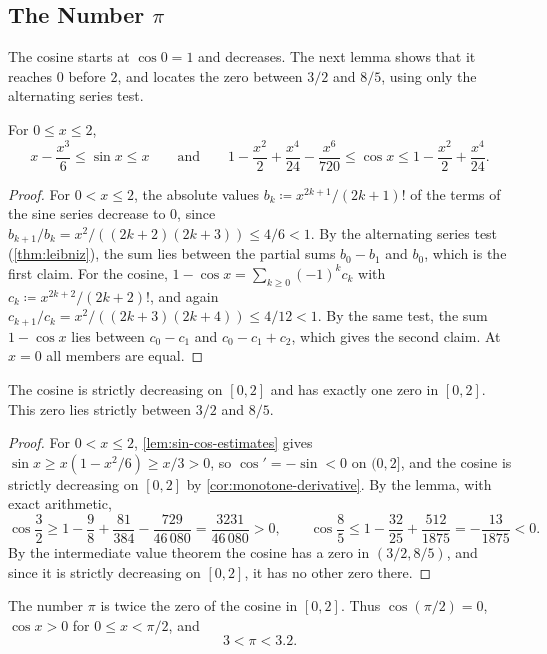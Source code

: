 \subsection{The Number \texorpdfstring{$\pi$}{pi}}

The cosine starts at $\cos0=1$ and decreases. The next lemma shows that it reaches $0$ before $2$, and locates the zero between $3/2$ and $8/5$, using only the alternating series test.

\begin{lemma}
\label{lem:sin-cos-estimates}
For $0\le x\le2$,
\[
x-\frac{x^3}6\le\sin x\le x\qquad\text{and}\qquad1-\frac{x^2}2+\frac{x^4}{24}-\frac{x^6}{720}\le\cos x\le1-\frac{x^2}2+\frac{x^4}{24}.
\]
\end{lemma}

\begin{proof}
For $0<x\le2$, the absolute values $b_k\coloneqq x^{2k+1}/(2k+1)!$ of the terms of the sine series decrease to $0$, since $b_{k+1}/b_k=x^2/((2k+2)(2k+3))\le4/6<1$. By the alternating series test (\cref{thm:leibniz}), the sum lies between the partial sums $b_0-b_1$ and $b_0$, which is the first claim. For the cosine, $1-\cos x=\sum_{k\ge0}(-1)^kc_k$ with $c_k\coloneqq x^{2k+2}/(2k+2)!$, and again $c_{k+1}/c_k=x^2/((2k+3)(2k+4))\le4/12<1$. By the same test, the sum $1-\cos x$ lies between $c_0-c_1$ and $c_0-c_1+c_2$, which gives the second claim. At $x=0$ all members are equal.
\end{proof}

\begin{theorem}
\label{thm:first-zero}
The cosine is strictly decreasing on $[0,2]$ and has exactly one zero in $[0,2]$. This zero lies strictly between $3/2$ and $8/5$.
\end{theorem}

\begin{proof}
For $0<x\le2$, \cref{lem:sin-cos-estimates} gives $\sin x\ge x(1-x^2/6)\ge x/3>0$, so $\cos'=-\sin<0$ on $(0,2]$, and the cosine is strictly decreasing on $[0,2]$ by \cref{cor:monotone-derivative}. By the lemma, with exact arithmetic,
\[
\cos\frac32\ge1-\frac98+\frac{81}{384}-\frac{729}{46\,080}=\frac{3231}{46\,080}>0,\qquad\cos\frac85\le1-\frac{32}{25}+\frac{512}{1875}=-\frac{13}{1875}<0 .
\]
By the intermediate value theorem the cosine has a zero in $(3/2,8/5)$, and since it is strictly decreasing on $[0,2]$, it has no other zero there.
\end{proof}

\begin{definition}
\label{def:pi}
The number $\pi$ is twice the zero of the cosine in $[0,2]$. Thus $\cos(\pi/2)=0$, $\cos x>0$ for $0\le x<\pi/2$, and
\[
3<\pi<3.2 .
\]
\end{definition}

